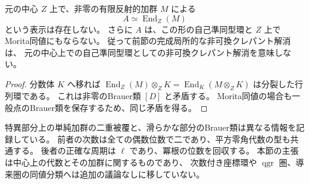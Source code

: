 \begin{corollary}[完成局所NCCRの大域降下を妨げるもの]
\label{cor:global-End-obstruction-v39}
元の中心 $Z$ 上で、非零の有限反射的加群 $M$ による
\[
 A\simeq\operatorname{End}_Z(M)
\]
という表示は存在しない。
さらに $A$ は、この形の自己準同型環と $Z$ 上でMorita同値にもならない。
従って前節の完成局所的な非可換クレパント解消は、
元の中心上での自己準同型環としての非可換クレパント解消を意味しない。
\end{corollary}

\begin{proof}
分数体 $K$ へ移れば
$\operatorname{End}_Z(M)\otimes_ZK=\operatorname{End}_K(M\otimes_ZK)$ は分裂した行列環である。
これは非零のBrauer類 $[D]$ と矛盾する。
Morita同値の場合も一般点のBrauer類を保存するため、同じ矛盾を得る。
\end{proof}

特異部分上の単純加群の二重被覆と、滑らかな部分のBrauer類は異なる情報を記録している。
前者の次数は全ての偶数位数で二であり、平方零角代数の型も共通する。
後者の正確な周期は $\ell$ であり、冪根の位数を回収する。
本節の主張は中心上の代数とその加群に関するものであり、
次数付き座標環や $\operatorname{qgr}$ 圏、導来圏の同値分類へは追加の議論なしに移していない。
